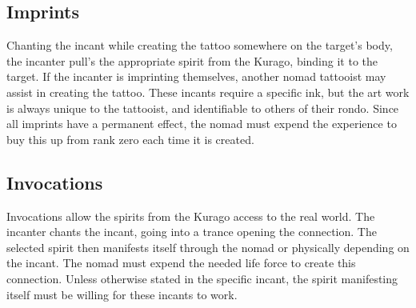 \begin{multicols*}{2}
\subsection{Imprints}

Chanting the incant while creating the tattoo somewhere on the target's body, the incanter pull's the  appropriate spirit from the Kurago, binding it to the target. If the incanter is imprinting themselves, another nomad tattooist may assist in creating the tattoo. These incants require a specific ink, but the art work is always unique to the tattooist, and identifiable to others of their rondo. Since all imprints have a permanent effect, the nomad must expend the experience to buy this up from rank zero each time it is created.

\subsection{Invocations}

Invocations allow the spirits from the Kurago access to the real world. The incanter chants the incant, going into a trance opening the connection. The selected spirit then manifests itself through the nomad or physically depending on the incant. The nomad must expend the needed life force to create this connection. Unless otherwise stated in the specific incant, the spirit manifesting itself must be willing for these incants to work.



\end{multicols*}
